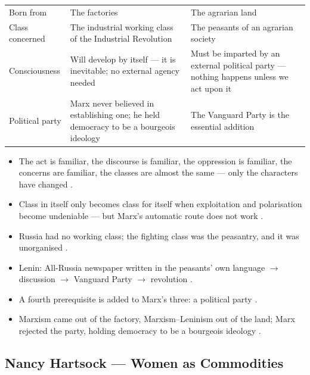 \begin{table}[h!]
\centering
\begin{tabularx}{\textwidth}{lYY}
\toprule
{}
\thead{} &  &  \\
\midrule
Born from & The factories & The agrarian land \\
Class concerned & The industrial working class of the Industrial Revolution & The peasants of an agrarian society \\
Consciousness & Will develop by itself --- it is inevitable; no external agency needed & Must be imparted by an external political party --- nothing happens unless we act upon it \\
Political party & Marx never believed in establishing one; he held democracy to be a bourgeois ideology & The Vanguard Party is the essential addition \\
\bottomrule
\end{tabularx}
\end{table}

\begin{itemize}
    \item The act is familiar, the discourse is familiar, the oppression is familiar, the concerns are familiar, the classes are almost the same --- only the characters have changed .
\end{itemize}

\begin{QuickRevision}
\begin{itemize}
    \item Class in itself only becomes class for itself when exploitation and polarisation become undeniable --- but Marx's automatic route does not work .
    \item Russia had no working class; the fighting class was the peasantry, and it was unorganised .
    \item Lenin: All-Russia newspaper written in the peasants' own language $\rightarrow$ discussion $\rightarrow$ Vanguard Party $\rightarrow$ revolution .
    \item A fourth prerequisite is added to Marx's three: a political party .
    \item Marxism came out of the factory, Marxism--Leninism out of the land; Marx rejected the party, holding democracy to be a bourgeois ideology .
\end{itemize}
\end{QuickRevision}

\subsection{Nancy Hartsock --- Women as Commodities}

